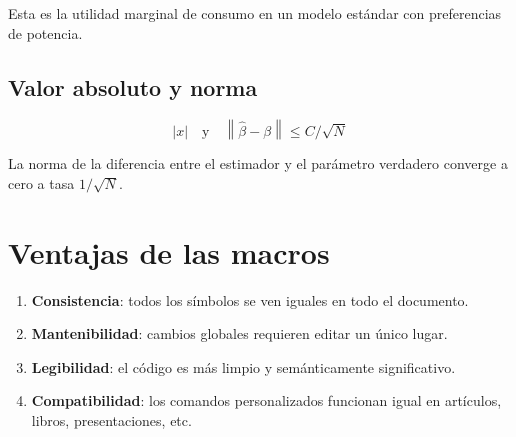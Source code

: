 \documentclass[12pt, a4paper]{article}
\newcommand{\abs}[1]{\left| #1 \right|}
\newcommand{\norm}[1]{\left\| #1 \right\|}
\begin{document}
Esta es la utilidad marginal de consumo en un modelo estándar con preferencias 
de potencia.

\subsection{Valor absoluto y norma}

\[
  \abs{x} \quad \text{y} \quad \norm{\hat{\beta} - \beta} \leq C / \sqrt{N}
\]

La norma de la diferencia entre el estimador y el parámetro verdadero converge 
a cero a tasa $1/\sqrt{N}$.

\section*{Ventajas de las macros}

\begin{enumerate}
  \item \textbf{Consistencia}: todos los símbolos se ven iguales en todo el documento.
  \item \textbf{Mantenibilidad}: cambios globales requieren editar un único lugar.
  \item \textbf{Legibilidad}: el código es más limpio y semánticamente significativo.
  \item \textbf{Compatibilidad}: los comandos personalizados funcionan igual en 
        artículos, libros, presentaciones, etc.
\end{enumerate}
\end{document}
